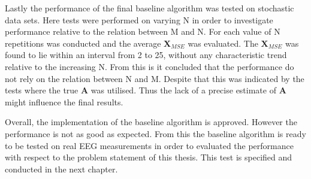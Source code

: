 Lastly the performance of the final baseline algorithm was tested on stochastic data sets. Here tests were performed on varying N in order to investigate performance relative to the relation between M and N. For each value of N repetitions was conducted and the average $\textbf{X}_{MSE}$ was evaluated. The $\textbf{X}_{MSE}$ was found to lie within an interval from 2 to 25, without any characteristic trend relative to the increasing N. From this is it concluded that the performance do not rely on the relation between N and M. Despite that this was indicated by the tests where the true $\textbf{A}$ was utilised. 
Thus the lack of a precise estimate of $\textbf{A}$ might influence the final results. 

Overall, the implementation of the baseline algorithm is approved. However the performance is not as good as expected. From this the baseline algorithm is ready  to be tested on real EEG measurements in order to evaluated the performance with respect to the problem statement of this thesis. This test is specified and conducted in the next chapter.           


